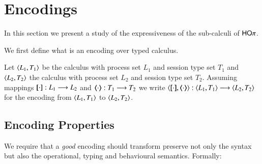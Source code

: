 \newcommand{\enc}[2]{\lrangle{\map{#1}, \mapt{#2}}}
\newcommand{\encod}[3]{\lrangle{\map{#1}^{#3}, \mapt{#2}^{#3}}}

\newcommand{\calc}[2]{\lrangle{#1, #2}}

\section{Encodings}

In this section we present a study of the expressiveness 
of the sub-calculi of $\mathsf{HO}\pi$.

We first define what is an encoding over typed calculus.

\begin{definition}
	Let $\calc{L_1}{T_1}$ be the calculus with process set $L_1$ and
	session type set $T_1$ and
	$\calc{L_2}{T_2}$ the calculus with process set $L_2$ and
	session type set $T_2$.
	Assuming mappings $[\!\![\cdot]\!\!]: L_1 \longrightarrow L_2$ and
	$\langle\!\!\langle\cdot\rangle\!\!\rangle: T_1 \longrightarrow T_2$
	we write $\enc{\cdot}{\cdot}: \calc{L_1}{T_1} \longrightarrow \calc{L_2}{T_2}$
	for the encoding from
	$\calc{L_1}{T_1}$ to $\calc{L_2}{T_2}$.
\end{definition}

\subsection{Encoding Properties}

We require that a {\em good} encoding should 
transform preserve not only the syntax but
also the operational, typing and behavioural
semantics. Formally:


